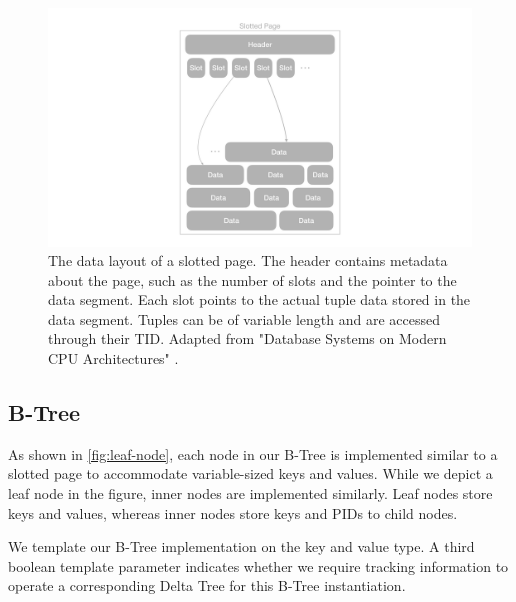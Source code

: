 \begin{figure}[htbp]
  \centering
  \includegraphics[width=1\textwidth]{figures/slotted_page.pdf}
  \caption{The data layout of a slotted page. The header contains metadata about the page, such as the number of slots and the pointer to the data segment. Each slot points to the actual tuple data stored in the data segment. Tuples can be of variable length and are accessed through their \ac{TID}. Adapted from "Database Systems on Modern CPU Architectures" \autocite{mdbs2024slides}.}
  \label{fig:slotted-page}
\end{figure}

\subsection*{B-Tree}

As shown in \autoref{fig:leaf-node}, each node in our B-Tree is implemented similar to a slotted page to accommodate variable-sized keys and values.
While we depict a leaf node in the figure, inner nodes are implemented similarly.
Leaf nodes store keys and values, whereas inner nodes store keys and \ac{PID}s to child nodes.

We template our B-Tree implementation on the key and value type.
A third boolean template parameter indicates whether we require tracking information to operate a corresponding Delta Tree for this B-Tree instantiation.

